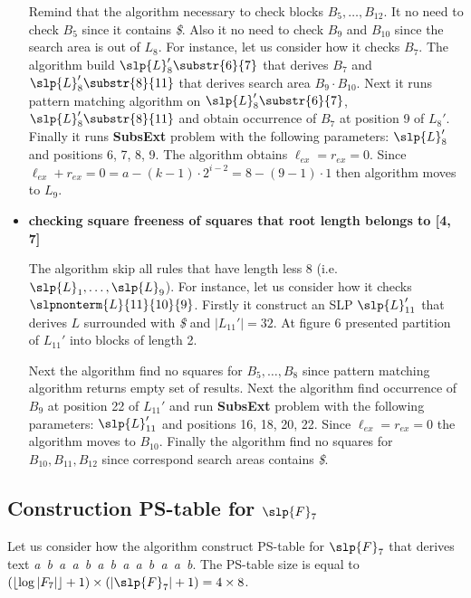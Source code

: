 \begin{appendix}
\begin{itemize}
  \LeechWordPartitionSimple
  
  Remind that the algorithm necessary to check blocks $B_5, \dots, B_{12}$. It no need to check $B_5$ since it contains
  \emph{\$}. Also it no need to check $B_9$ and $B_{10}$ since the search area is out of $L_8$. For instance, let us
  consider how it checks $B_7$. The algorithm build $\slp{L}_8'\substr{6}{7}$ that derives $B_7$ and  
  $\slp{L}_8'\substr{8}{11}$ that derives search area $B_9 \cdot B_{10}$. Next it runs pattern matching algorithm on
  $\slp{L}_8'\substr{6}{7}$, $\slp{L}_8'\substr{8}{11}$ and obtain occurrence of $B_7$ at position 9 of $L_8'$. Finally
  it runs \textbf{SubsExt} problem with the following parameters: $\slp{L}_8'$ and positions 6, 7, 8, 9. The algorithm
  obtains $\ell_{ex} = r_{ex} = 0$. Since $\ell_{ex} + r_{ex} = 0 = a - (k - 1) \cdot 2^{i-2} = 8 - (9 - 1) \cdot 1$ then
  algorithm moves to $L_9$.

  \item \textbf{checking square freeness of squares that root length belongs to [4, 7]}
  
  The algorithm skip all rules that have length less 8 (i.e. $\slp{L}_1, \dots, \slp{L}_9$). For instance, let us
  consider how it checks $\slpnonterm{L}{11}{10}{9}$. Firstly it construct an SLP $\slp{L}_{11}'$ that derives $L$
  surrounded with \emph{\$} and $|L_{11}'| = 32$. At figure 6 presented partition of $L_{11}'$ into blocks of length
  2. 
  
  \LeechWordPartitionComplex

  Next the algorithm find no squares for $B_5, \dots, B_8$ since pattern matching algorithm returns empty set of
  results. Next the algorithm find occurrence of $B_9$ at position 22 of $L_{11}'$ and run \textbf{SubsExt}
  problem with the following parameters: $\slp{L}_{11}'$ and positions 16, 18, 20, 22. Since $\ell_{ex} = r_{ex} = 0$ the
  algorithm moves to $B_{10}$. Finally the algorithm find no squares for $B_{10}, B_{11}, B_{12}$ since correspond
  search areas contains \emph{\$}.
\end{itemize}

\subsection{Construction PS-table for $\slp{F}_7$}

Let us consider how the algorithm construct PS-table for $\slp{F}_7$ that derives text \emph{a~b~a~a~b~a~b~a~a~b~a~a~b}.
The PS-table size is equal to $(\lfloor\log |F_7|\rfloor+1)\times (|\slp{F}_7|+1) = 4 \times 8$. 


\end{appendix}
